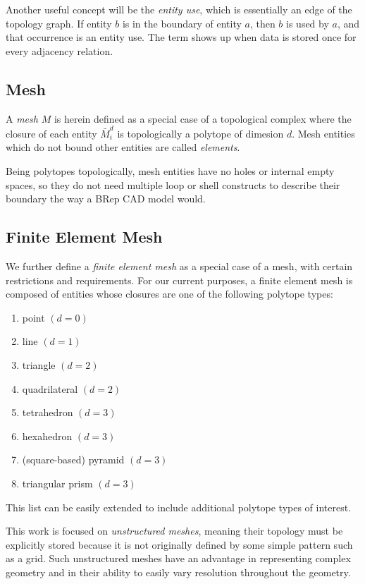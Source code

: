 Another useful concept will be the {\it entity use},
which is essentially an edge of the topology graph.
If entity $b$ is in the boundary of entity $a$, then
$b$ is used by $a$, and that occurrence is an entity use.
The term shows up when data is stored once for every adjacency relation.

\subsection{Mesh}
\label{sec:def_mesh}

A {\it mesh} $M$ is herein defined as a special case of a topological
complex where the closure of each entity $\bar{M}^d_i$
is topologically a polytope of dimesion $d$.
Mesh entities which do not bound other entities
are called \emph{elements}.

Being polytopes topologically, mesh entities have no
holes or internal empty spaces,
so they do not need multiple loop or shell constructs to
describe their boundary the way a BRep CAD model would.

\subsection{Finite Element Mesh}
\label{sec:def_fem}

We further define a {\it finite element mesh} as a special case
of a mesh, with certain restrictions and requirements.
For our current purposes, a finite element mesh is composed
of entities whose closures are one of the following
polytope types:

\begin{enumerate}
\item point $(d = 0)$
\item line $(d = 1)$
\item triangle $(d = 2)$
\item quadrilateral $(d = 2)$
\item tetrahedron $(d = 3)$
\item hexahedron $(d = 3)$
\item (square-based) pyramid $(d = 3)$
\item triangular prism $(d = 3)$
\end{enumerate}

This list can be easily extended to include additional polytope
types of interest.

This work is focused on \emph{unstructured meshes}, meaning
their topology must be explicitly stored because it
is not originally defined by some simple pattern such as a grid.
Such unstructured meshes have an
advantage in representing complex geometry and in their
ability to easily vary resolution throughout the geometry.

